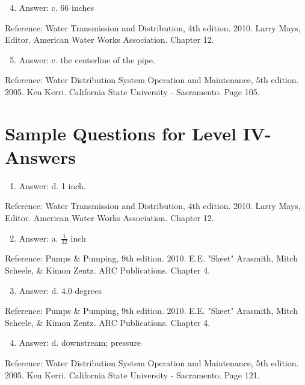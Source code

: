 \documentclass[10pt]{article}
\begin{document}
\begin{enumerate}
  \setcounter{enumi}{3}
  \item Answer: c. 66 inches
\end{enumerate}

Reference: Water Transmission and Distribution, 4th edition. 2010. Larry Mays, Editor. American Water Works Association. Chapter 12.

\begin{enumerate}
  \setcounter{enumi}{4}
  \item Answer: c. the centerline of the pipe.
\end{enumerate}

Reference: Water Distribution System Operation and Maintenance, 5th edition. 2005. Ken Kerri. California State University - Sacramento. Page 105.

\section{Sample Questions for Level IV-Answers}
\begin{enumerate}
  \item Answer: d. 1 inch.
\end{enumerate}

Reference: Water Transmission and Distribution, 4th edition. 2010. Larry Mays, Editor. American Water Works Association. Chapter 12.

\begin{enumerate}
  \setcounter{enumi}{1}
  \item Answer: a. $\frac{1}{32}$ inch
\end{enumerate}

Reference: Pumps \& Pumping, 9th edition. 2010. E.E. "Skeet" Arasmith, Mitch Scheele, \& Kimon Zentz. ARC Publications. Chapter 4.

\begin{enumerate}
  \setcounter{enumi}{2}
  \item Answer: d. $4.0$ degrees
\end{enumerate}

Reference: Pumps \& Pumping, 9th edition. 2010. E.E. "Skeet" Arasmith, Mitch Scheele, \& Kimon Zentz. ARC Publications. Chapter 4.

\begin{enumerate}
  \setcounter{enumi}{3}
  \item Answer: d. downstream; pressure
\end{enumerate}

Reference: Water Distribution System Operation and Maintenance, 5th edition. 2005. Ken Kerri. California State University - Sacramento. Page 121.
\end{document}
